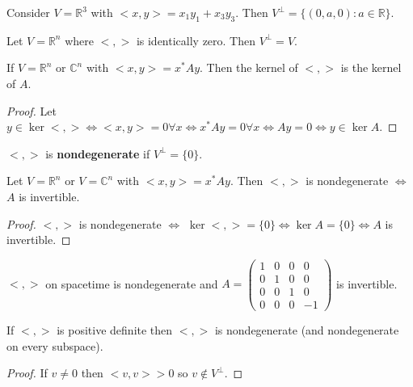 \documentclass{article}
\newcommand{\vocab}[1]{\textbf{\color{blue!90}\boldmath #1}}
\newcommand{\C}{\mathbb{C}}
\newcommand{\R}{\mathbb{R}}
\begin{document}
\begin{example}
Consider $V=\R^3$ with $<x,y>=x_1y_1+x_3y_3$. Then $V^\perp=\{(0,a,0):a\in \R\}$.
\end{example}
\begin{example}
Let $V=\R^n$ where $<,>$ is identically zero. Then $V^\perp=V$.
\end{example}
\begin{proposition}
If $V=\R^n$ or $\C^n$ with $<x,y>=x^*Ay$. Then the kernel of $<,>$ is the kernel of $A$.
\end{proposition}
\begin{proof}
Let $y\in\ker<,>\iff<x,y>=0\forall x\iff x^*Ay=0\forall x\iff Ay=0\iff y\in\ker A$.
\end{proof}
\begin{definition}
$<,>$ is \vocab{nondegenerate} if $V^\perp=\{0\}$.
\end{definition}
\begin{proposition}
Let $V=\R^n$ or $V=\C^n$ with $<x,y>=x^*Ay$. Then $<,>$ is nondegenerate $\iff$ $A$ is invertible.
\end{proposition}
\begin{proof}
$<,>$ is nondegenerate $\iff$ $\ker<,>=\{0\}\iff\ker A=\{0\}\iff A$ is invertible.
\end{proof}
\begin{example}
$<,>$ on spacetime is nondegenerate and $A=\begin{pmatrix}
1&0&0&0\\0&1&0&0\\0&0&1&0\\0&0&0&-1
\end{pmatrix}$ is invertible.
\end{example}
\begin{example}
If $<,>$ is positive definite then $<,>$ is nondegenerate (and nondegenerate on every subspace).
\end{example}
\begin{proof}
If $v\neq0$ then $<v,v>>0$ so $v\notin V^\perp$.
\end{proof}
\end{document}
